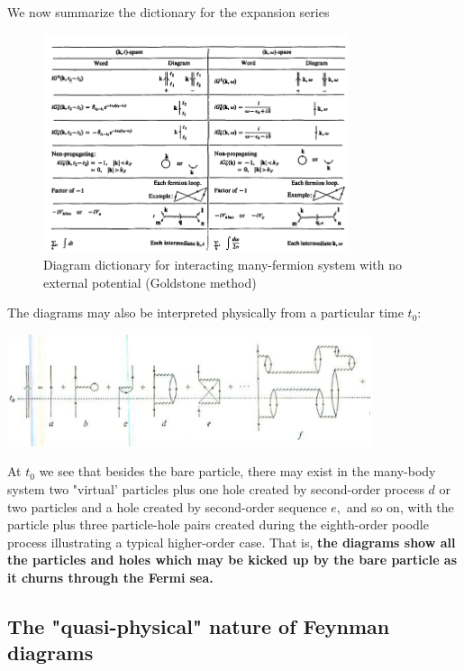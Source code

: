 We now summarize the dictionary for the expansion series
\begin{figure}
    \centering
    \includegraphics[width=0.8\textwidth]{screenshots/interacting-fermi-sys-dict.PNG}
    \caption{Diagram dictionary for interacting many-fermion system with no external potential (Goldstone method)}
    \label{fig:goldstone-interacting-fermi-dict}
\end{figure}
The diagrams may also be interpreted physically from a particular time $t_0$:
\begin{center}
    \includegraphics[width=0.8\textwidth]{screenshots/goldstone-particular-time.PNG}
\end{center}
At $t_{0}$ we see that besides the bare particle, there may exist in the many-body system two "virtual' particles plus one hole created by second-order process $d$ or two particles and a hole created by second-order sequence $e,$ and so on, with the particle plus three particle-hole pairs created during the eighth-order poodle process illustrating a typical higher-order case. That is, \textbf{the diagrams show all the particles and holes which may be kicked up by the bare particle as it churns through the Fermi sea.}
\subsection{The "quasi-physical" nature of Feynman diagrams}